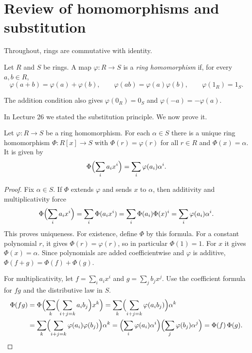 \documentclass[reqno,11pt]{amsart}
\begin{document}
\raggedbottom
\makelecturetitle

\section{Review of homomorphisms and substitution}

Throughout, rings are commutative with identity.

\begin{define}
Let $R$ and $S$ be rings. A map $\varphi:R\to S$ is a
\emph{ring homomorphism} if, for every $a,b\in R$,
\[
  \varphi(a+b)=\varphi(a)+\varphi(b),\qquad
  \varphi(ab)=\varphi(a)\varphi(b),\qquad
  \varphi(1_R)=1_S.
\]
\end{define}

The addition condition also gives $\varphi(0_R)=0_S$ and
$\varphi(-a)=-\varphi(a)$.

In Lecture 26 we stated the substitution principle. We now prove it.

\begin{proposition}
Let $\varphi:R\to S$ be a ring homomorphism. For each $\alpha\in S$
there is a unique ring homomorphism $\Phi:R[x]\to S$ with
$\Phi(r)=\varphi(r)$ for all $r\in R$ and $\Phi(x)=\alpha$. It is given by
\[
  \Phi\Bigl(\sum_i a_ix^i\Bigr)=\sum_i\varphi(a_i)\alpha^i.
\]
\end{proposition}
\begin{proof}
Fix $\alpha\in S$. If $\Phi$ extends $\varphi$ and sends $x$ to
$\alpha$, then additivity and multiplicativity force
\[
  \Phi\Bigl(\sum_i a_ix^i\Bigr)
  =\sum_i\Phi(a_ix^i)
  =\sum_i\Phi(a_i)\Phi(x)^i
  =\sum_i\varphi(a_i)\alpha^i.
\]
This proves uniqueness. For existence, define $\Phi$ by this formula.
For a constant polynomial $r$, it gives $\Phi(r)=\varphi(r)$, so in
particular $\Phi(1)=1$. For $x$ it gives $\Phi(x)=\alpha$.
Since polynomials are added coefficientwise and $\varphi$ is additive,
$\Phi(f+g)=\Phi(f)+\Phi(g)$.

For multiplicativity, let $f=\sum_i a_ix^i$ and $g=\sum_j b_jx^j$.
Use the coefficient formula for $fg$ and the distributive law in $S$.
\begin{align*}
  \Phi(fg)
  &=\Phi\Bigl(\sum_k\Bigl(\sum_{i+j=k}a_ib_j\Bigr)x^k\Bigr)
   =\sum_k\Bigl(\sum_{i+j=k}\varphi(a_ib_j)\Bigr)\alpha^k\\
  &=\sum_k\Bigl(\sum_{i+j=k}\varphi(a_i)\varphi(b_j)\Bigr)\alpha^k
   =\Bigl(\sum_i\varphi(a_i)\alpha^i\Bigr)
    \Bigl(\sum_j\varphi(b_j)\alpha^j\Bigr)
   =\Phi(f)\,\Phi(g).\qedhere
\end{align*}
\end{proof}
\end{document}
